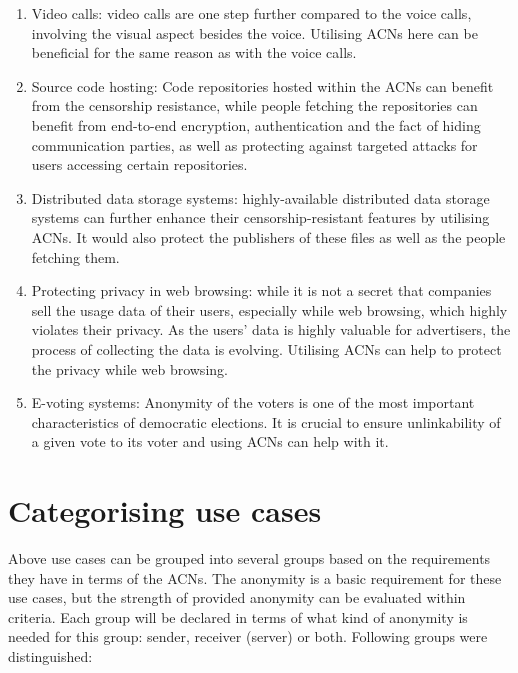 \begin{enumerate}
    \item Video calls: video calls are one step further compared to the voice calls, involving the visual aspect besides the voice. Utilising ACNs here can be beneficial for the same reason as with the voice calls.
    \item Source code hosting: Code repositories hosted within the ACNs can benefit from the censorship resistance, while people fetching the repositories can benefit from end-to-end encryption, authentication and the fact of hiding communication parties, as well as protecting against targeted attacks for users accessing certain repositories.
    \item Distributed data storage systems: highly-available distributed data storage systems can further enhance their censorship-resistant features by utilising ACNs. It would also protect the publishers of these files as well as the people fetching them.
    \item Protecting privacy in web browsing: while it is not a secret that companies sell the usage data of their users, especially while web browsing, which highly violates their privacy. As the users’ data is highly valuable for advertisers, the process of collecting the data is evolving. Utilising ACNs can help to protect the privacy while web browsing.
    \item E-voting systems: Anonymity of the voters is one of the most important characteristics of democratic elections. It is crucial to ensure unlinkability of a given vote to its voter and using ACNs can help with it.
\end{enumerate}


\section{Categorising use cases}
Above use cases can be grouped into several groups based on the requirements they have in terms of the ACNs. The anonymity is a basic requirement for these use cases, but the strength of provided anonymity can be evaluated within criteria. Each group will be declared in terms of what kind of anonymity is needed for this group: sender, receiver (server) or both. Following groups were distinguished:

